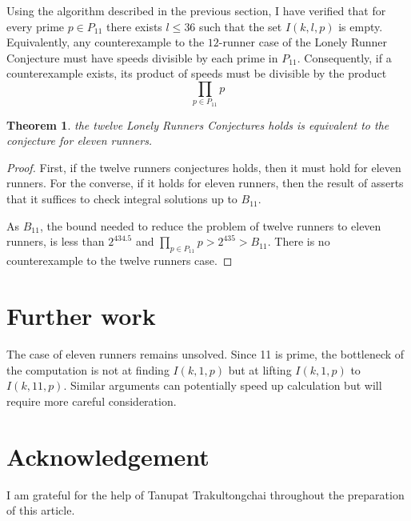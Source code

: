 \documentclass[10pt,leqno]{amsart}
\newtheorem{theorem}{Theorem}[]
\begin{document}
Using the algorithm described in the previous section, I have verified
that for every prime $p \in P_{11}$ there exists $l \le 36$ such that the set $I(k, l, p)$ is empty.
Equivalently, any counterexample to the $12$-runner case of the
Lonely Runner Conjecture must have speeds divisible by each prime in
$P_{11}$. Consequently, if a counterexample exists, its product of speeds must be
divisible by the product
\[ \prod_{p \in P_{11}} p \]

\begin{theorem}
  the twelve Lonely Runners Conjectures holds is equivalent to the conjecture for eleven runners.
\end{theorem}
\begin{proof}
  First, if the twelve runners conjectures holds, then it must hold for eleven runners.
  For the converse, if it holds for eleven runners, then the result of \cite{Malikiosis} asserts that it suffices 
  to check integral solutions up to $B_{11}$.

  As $B_{11}$, the bound needed to reduce the problem of twelve runners to eleven runners, is less than $2^{434.5}$ and 
  $\prod_{p \in P_{11}} p > 2^{435} > B_{11}$. There is no counterexample to the twelve runners case.
\end{proof}

\section*{Further work}
The case of eleven runners remains unsolved. Since 11 is prime, the bottleneck of the computation is not at finding $I(k, 1, p)$ but at 
lifting $I(k, 1, p)$ to $I(k, 11, p)$. Similar arguments can potentially speed up calculation but will require more careful consideration.

\section*{Acknowledgement}
I am grateful for the help of Tanupat Trakultongchai throughout the preparation of this article.



\end{document}
